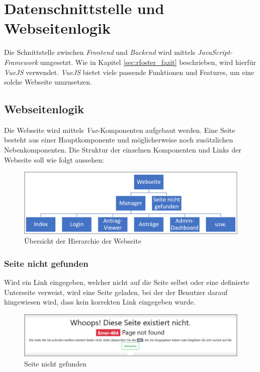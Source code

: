 \section{Datenschnittstelle und Webseitenlogik}
Die Schnittstelle zwischen \textit{Frontend} und \textit{Backend} wird mittels \textit{JavaScript-Framework} umgesetzt. Wie in Kapitel \autoref{sec:rfoster_fazit} beschrieben, wird hierfür \textit{VueJS} verwendet. \textit{VueJS} bietet viele passende Funktionen und Features, um  eine solche Webseite umzusetzen.
\subsection{Webseitenlogik}
\label{sec:webseitenlogik}
Die Webseite wird mittels \textit{Vue}-Komponenten aufgebaut werden. Eine Seite besteht aus einer Hauptkomponente und möglicherweise noch zusätzlichen Nebenkomponenten. Die Struktur der einzelnen Komponenten und Links der Webseite soll wie folgt aussehen:
\begin{figure}[H]
	\centering
	\includegraphics[width=0.8\linewidth]{images/rfoster_konzept/Webseite_hierarchie}
	\caption[Hierarchie der Webseite]{Übersicht der Hierarchie der Webseite}
	\label{fig:webseitehierachie}
\end{figure}

\subsubsection{Seite nicht gefunden}
\label{sec:not_found}
Wird ein Link eingegeben, welcher nicht auf die Seite selbst oder eine definierte Unterseite verweist, wird eine Seite geladen, bei der der Benutzer darauf hingewiesen wird, dass kein korrekten Link eingegeben wurde.
\begin{figure}[H]
	\centering
	\includegraphics[width=0.6\linewidth]{images/rfoster_konzept/page_not_found}
	\caption[Seite nicht gefunden]{Seite nicht gefunden}
	\label{fig:pagenotfound}
\end{figure}

